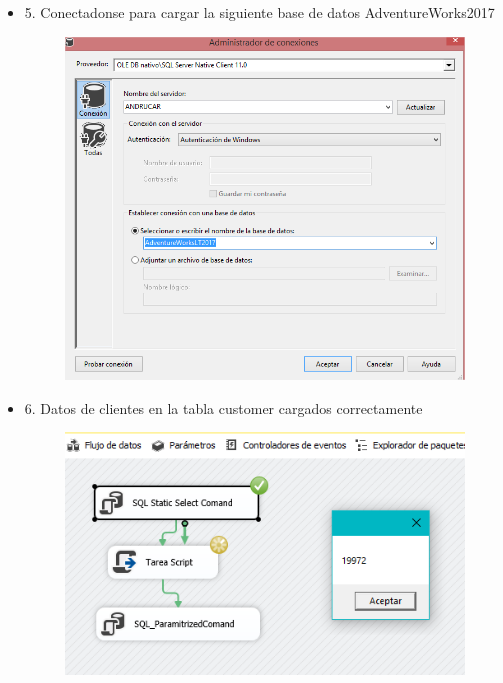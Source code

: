 \begin{itemize}
	\item 5. Conectadonse para cargar la siguiente base de datos AdventureWorks2017
		\begin{figure}[H]
		\begin{center}
		\includegraphics[width=18cm]{./Imagenes/imagen5}
		\end{center}
		\end{figure}
     
     
	\item 6. Datos de clientes en la tabla customer cargados correctamente
		\begin{figure}[H]
		\begin{center}
		\includegraphics[width=18cm]{./Imagenes/imagen6}
		\end{center}
		\end{figure}
     



\end{itemize}
		